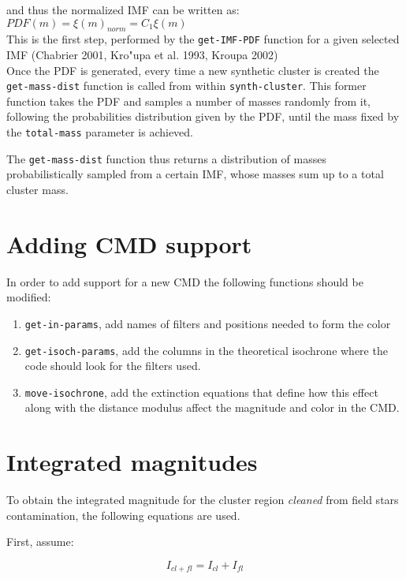 \documentclass[10pt]{article}
\begin{document}
\noindent and thus the normalized IMF can be written as:\\

$PDF(m) = \xi(m)_{norm} = C_1 \xi(m) $\\

This is the first step, performed by the \texttt{get-IMF-PDF} function for a given selected
IMF (Chabrier 2001, Kro"upa et al. 1993, Kroupa 2002)\\


Once the PDF is generated, every time a new synthetic cluster is created the
\texttt{get-mass-dist} function is called from within \texttt{synth-cluster}. This
former function takes the PDF and samples a number of masses randomly from it, following
the probabilities distribution given by the PDF, until the mass fixed by the
\texttt{total-mass} parameter is achieved.

The \texttt{get-mass-dist} function thus returns a distribution of masses probabilistically
sampled from a certain IMF, whose masses sum up to a total cluster mass.


\section{Adding CMD support}

In order to add support for a new CMD the following functions should be modified:
\begin{enumerate}
\item \texttt{get-in-params}, add names of filters and positions needed to form the color
\item \texttt{get-isoch-params}, add the columns in the theoretical isochrone
where the code should look for the filters used.
\item \texttt{move-isochrone}, add the extinction equations that define how
this effect along with the distance modulus affect the magnitude and color
in the CMD.
\end{enumerate}

\section{Integrated magnitudes}

To obtain the integrated magnitude for the cluster region \textit{cleaned}
from field stars contamination, the following equations are used.

First, assume:

\begin{equation}
I_{cl+fl} = I_{cl} + I_{fl}
\label{eq:integ-cl-fl}
\end{equation}
\end{document}
